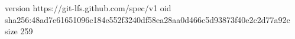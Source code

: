 version https://git-lfs.github.com/spec/v1
oid sha256:48ad7e61651096c184e552f3240df58ea28aa0d466c5d93873f40e2c2d77a92c
size 259

